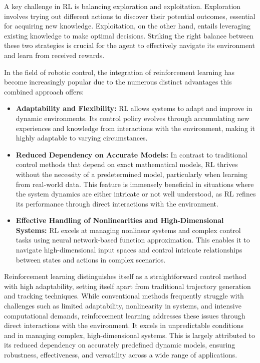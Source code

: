 A key challenge in RL is balancing exploration and exploitation. Exploration involves trying out different actions to discover their potential outcomes, essential for acquiring new knowledge. Exploitation, on the other hand, entails leveraging existing knowledge to make optimal decisions. Striking the right balance between these two strategies is crucial for the agent to effectively navigate its environment and learn from received rewards.

In the field of robotic control\cite{kober2013reinforcement}, the integration of reinforcement learning has become increasingly popular due to the numerous distinct advantages this combined approach offers:

\begin{itemize}
    \item \textbf{Adaptability and Flexibility:}
    RL allows systems to adapt and improve in dynamic environments. Its control policy evolves through accumulating new experiences and knowledge from interactions with the environment, making it highly adaptable to varying circumstances.

    \item \textbf{Reduced Dependency on Accurate Models:}
    In contrast to traditional control methods that depend on exact mathematical models, RL thrives without the necessity of a predetermined model, particularly when learning from real-world data. This feature is immensely beneficial in situations where the system dynamics are either intricate or not well understood, as RL refines its performance through direct interactions with the environment.

    \item \textbf{Effective Handling of Nonlinearities and High-Dimensional Systems:}
    RL excels at managing nonlinear systems and complex control tasks using neural network-based function approximation. This enables it to navigate high-dimensional input spaces and control intricate relationships between states and actions in complex scenarios.
\end{itemize}

Reinforcement learning distinguishes itself as a straightforward control method with high adaptability, setting itself apart from traditional trajectory generation and tracking techniques. While conventional methods frequently struggle with challenges such as limited adaptability, nonlinearity in systems, and intensive computational demands, reinforcement learning addresses these issues through direct interactions with the environment. It excels in unpredictable conditions and in managing complex, high-dimensional systems. This is largely attributed to its reduced dependency on accurately predefined dynamic models, ensuring robustness, effectiveness, and versatility across a wide range of applications.


